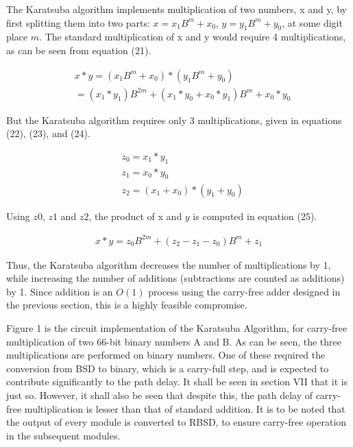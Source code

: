 \documentclass[conference]{IEEEtran}
\begin{document}
The Karatsuba algorithm implements multiplication of two numbers, x and y, by first splitting them into two parts: $x = x_{1}B^{m} + x_{0}$, $y = y_{1}B^{m} + y_{0}$, at some digit place $m$. The standard multiplication of x and y would require 4 multiplications, as can be seen from equation (21).

\vspace{-1em}   
\begin{equation}    
\begin{aligned}   
&x * y = (x_{1}B^{m} + x_{0}) * (y_{1}B^{m} + y_{0})\\    
&= (x_{1} * y_{1})B^{2m} + (x_{1}*y_{0} + x_{0}*y_{1})B^{m} + x_{0}*y_{0}   
\end{aligned}   
\end{equation}

But the Karatsuba algorithm requires only 3 multiplications, given in equations (22), (23), and (24).

\vspace{-1em}
\begin{align}
&z_{0} = x_{1} * y_{1}\\
&z_{1} = x_{0} * y_{0}\\
&z_{2} = (x_{1} + x_{0}) * (y_{1} + y_{0})
\end{align}

Using $z0$, $z1$ and $z2$, the product of x and $y$ is computed in equation (25).

\vspace{-1em}
\begin{align}
x * y = z_{0}B^{2m} + (z_{2} - z_{1} - z_{0})B^{m} + z_{1}
\end{align}

Thus, the Karatsuba algorithm decreases the number of multiplications by 1, while increasing the number of additions (subtractions are counted as additions) by 1. Since addition is an $O(1)$ process using the carry-free adder designed in the previous section, this is a highly feasible compromise.

Figure 1 is the circuit implementation of the Karatsuba Algorithm, for carry-free multiplication of two 66-bit binary numbers A and B. As can be seen, the three multiplications are performed on binary numbers. One of these required the conversion from BSD to binary, which is a carry-full step, and is expected to contribute significantly to the path delay. It shall be seen in section VII that it is just so. However, it shall also be seen that despite this, the path delay of carry-free multiplication is lesser than that of standard addition. It is to be noted that the output of every module is converted to RBSD, to ensure carry-free operation in the subsequent modules.
\end{document}
